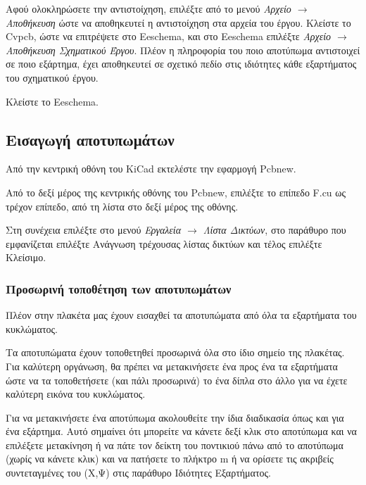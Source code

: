 \documentclass[a4paper]{article}
\begin{document}
Αφού ολοκληρώσετε την αντιστοίχηση, επιλέξτε από το μενού \textit{Αρχείο $\rightarrow$ Αποθήκευση} ώστε να αποθηκευτεί η αντιστοίχηση στα αρχεία του έργου. Κλείστε το \textenglish{Cvpcb}, ώστε να επιτρέψετε στο Eeschema, και στο Eeschema  επιλέξτε \textit{Αρχείο $\rightarrow$ Αποθήκευση Σχηματικού Έργου}. Πλέον η πληροφορία του ποιο αποτύπωμα αντιστοιχεί σε ποιο εξάρτημα, έχει αποθηκευτεί σε σχετικό πεδίο στις ιδιότητες κάθε εξαρτήματος του σχηματικού έργου. 

Κλείστε το \textenglish{Eeschema}.


\subsection{Εισαγωγή αποτυπωμάτων}
Από την κεντρική οθόνη του \textenglish{KiCad} εκτελέστε την εφαρμογή Pcbnew. 

Από το δεξί μέρος της κεντρικής οθόνης του Pcbnew, επιλέξτε το επίπεδο F.cu ως τρέχον επίπεδο, από τη λίστα στο δεξί μέρος της οθόνης.

Στη συνέχεια επιλέξτε στο μενού \textit{Εργαλεία $\rightarrow$ Λίστα Δικτύων}, στο παράθυρο που εμφανίζεται επιλέξτε Ανάγνωση τρέχουσας λίστας δικτύων και τέλος επιλέξτε Κλείσιμο.

\subsubsection{Προσωρινή τοποθέτηση των αποτυπωμάτων}
Πλέον στην πλακέτα μας έχουν εισαχθεί τα αποτυπώματα από όλα τα εξαρτήματα του κυκλώματος. 

Τα αποτυπώματα έχουν τοποθετηθεί προσωρινά όλα στο ίδιο σημείο της πλακέτας. Για καλύτερη οργάνωση, θα πρέπει να μετακινήσετε ένα προς ένα τα εξαρτήματα ώστε να τα τοποθετήσετε (και πάλι προσωρινά) το ένα δίπλα στο άλλο για να έχετε καλύτερη εικόνα του κυκλώματος. 

Για να μετακινήσετε ένα αποτύπωμα ακολουθείτε την ίδια διαδικασία όπως και για ένα εξάρτημα. Αυτό σημαίνει ότι μπορείτε να κάνετε δεξί κλικ στο αποτύπωμα και να επιλέξετε μετακίνηση ή να πάτε τον δείκτη του ποντικιού πάνω από το αποτύπωμα (χωρίς να κάνετε κλικ) και να πατήσετε το πλήκτρο m ή να ορίσετε τις ακριβείς συντεταγμένες του (Χ,Ψ) στις παράθυρο Ιδιότητες Εξαρτήματος. 
\end{document}
